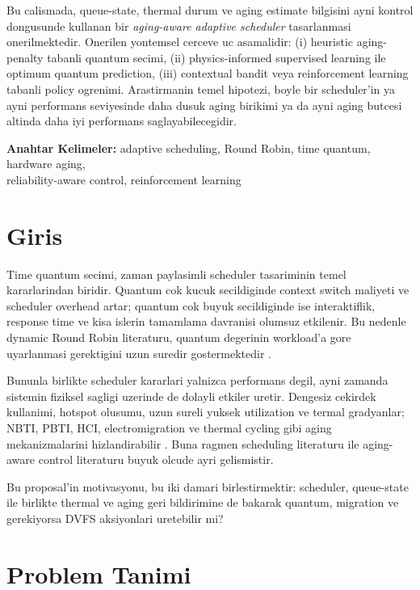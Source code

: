 \documentclass[12pt,a4paper]{article}
\begin{document}
Bu calismada, queue-state, thermal durum ve aging estimate bilgisini ayni kontrol dongusunde kullanan
bir \textit{aging-aware adaptive scheduler} tasarlanmasi onerilmektedir. Onerilen yontemsel cerceve uc
asamalidir: (i) heuristic aging-penalty tabanli quantum secimi, (ii) physics-informed supervised learning
ile optimum quantum prediction, (iii) contextual bandit veya reinforcement learning tabanli policy ogrenimi.
Arastirmanin temel hipotezi, boyle bir scheduler'in ya ayni performans seviyesinde daha dusuk aging birikimi
ya da ayni aging butcesi altinda daha iyi performans saglayabilecegidir.

\textbf{Anahtar Kelimeler:} adaptive scheduling, Round Robin, time quantum, hardware aging,\\ reliability-aware control, reinforcement learning

\newpage
{}
\onehalfspacing

\section{Giris}

Time quantum secimi, zaman paylasimli scheduler tasariminin temel kararlarindan biridir. Quantum cok kucuk
secildiginde context switch maliyeti ve scheduler overhead artar; quantum cok buyuk secildiginde ise interaktiflik,
response time ve kisa islerin tamamlama davranisi olumsuz etkilenir. Bu nedenle dynamic Round Robin literaturu,
quantum degerinin workload'a gore uyarlanmasi gerektigini uzun suredir gostermektedir \cite{behera2010,noon2011,marr2022,zohora2024}.

Bununla birlikte scheduler kararlari yalnizca performans degil, ayni zamanda sistemin fiziksel sagligi uzerinde de
dolayli etkiler uretir. Dengesiz cekirdek kullanimi, hotspot olusumu, uzun sureli yuksek utilization ve termal
gradyanlar; NBTI, PBTI, HCI, electromigration ve thermal cycling gibi aging mekanizmalarini hizlandirabilir
\cite{srinivasan2004,agarwal2007,kumar2011}. Buna ragmen scheduling literaturu ile aging-aware control literaturu
buyuk olcude ayri gelismistir.

Bu proposal'in motivasyonu, bu iki damari birlestirmektir: scheduler, queue-state ile birlikte thermal ve aging
geri bildirimine de bakarak quantum, migration ve gerekiyorsa DVFS aksiyonlari uretebilir mi?

\section{Problem Tanimi}
\end{document}
